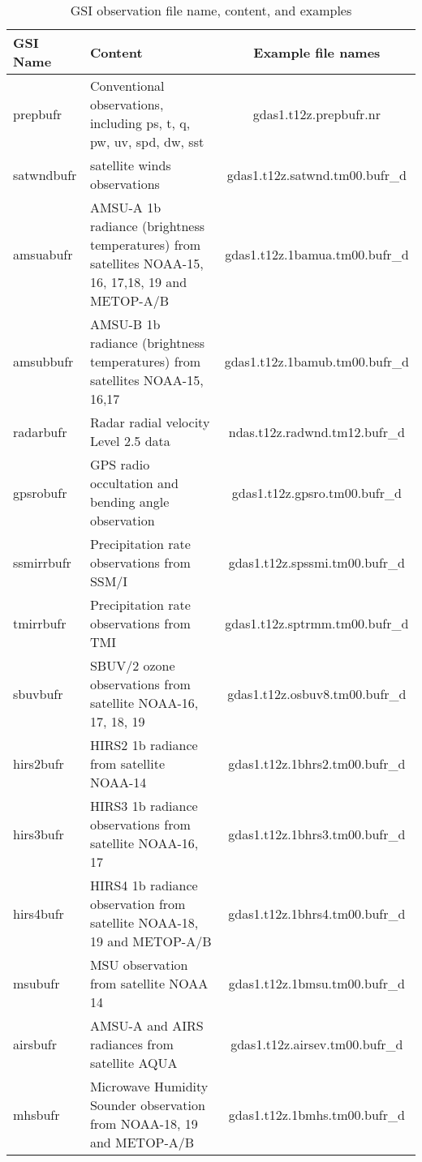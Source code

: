 \begin{table}[htbp]
\centering
\begin{footnotesize}
\caption{GSI observation file name, content, and examples}
\begin{tabular}{|l|p{7cm}|c|}
\hline
\hline
GSI Name  & Content & Example file names \\
\hline
\hline
prepbufr & Conventional observations, including ps, t, q, pw, uv, spd, dw, sst & gdas1.t12z.prepbufr.nr \\
\hline
satwndbufr & satellite winds observations &	gdas1.t12z.satwnd.tm00.bufr\_d \\
\hline
amsuabufr &	AMSU-A 1b radiance (brightness temperatures) from satellites
 NOAA-15, 16, 17,18, 19 and METOP-A/B &	gdas1.t12z.1bamua.tm00.bufr\_d \\
\hline
amsubbufr &	AMSU-B 1b radiance (brightness temperatures) from satellites NOAA-15, 16,17 &	gdas1.t12z.1bamub.tm00.bufr\_d \\
\hline
radarbufr &	Radar radial velocity Level 2.5 data &	ndas.t12z.radwnd.tm12.bufr\_d \\
\hline
gpsrobufr &	GPS radio occultation and bending angle observation & gdas1.t12z.gpsro.tm00.bufr\_d \\
\hline
ssmirrbufr & Precipitation rate observations from SSM/I & gdas1.t12z.spssmi.tm00.bufr\_d \\
\hline
tmirrbufr &	Precipitation rate observations from TMI & 	gdas1.t12z.sptrmm.tm00.bufr\_d \\
\hline
sbuvbufr &	SBUV/2 ozone observations from satellite NOAA-16, 17, 18, 19 &	gdas1.t12z.osbuv8.tm00.bufr\_d \\
\hline
hirs2bufr &	HIRS2 1b radiance from satellite NOAA-14 &	gdas1.t12z.1bhrs2.tm00.bufr\_d \\
\hline
hirs3bufr &	HIRS3 1b radiance observations from satellite NOAA-16, 17 &	gdas1.t12z.1bhrs3.tm00.bufr\_d \\
\hline
hirs4bufr &	HIRS4 1b radiance observation from satellite NOAA-18, 19 and METOP-A/B &	gdas1.t12z.1bhrs4.tm00.bufr\_d \\
\hline
msubufr	& MSU observation from satellite NOAA 14  &	gdas1.t12z.1bmsu.tm00.bufr\_d \\
\hline
airsbufr &	AMSU-A and AIRS radiances from satellite AQUA &	gdas1.t12z.airsev.tm00.bufr\_d \\
\hline
mhsbufr	& Microwave Humidity Sounder observation from NOAA-18, 19 and METOP-A/B &	gdas1.t12z.1bmhs.tm00.bufr\_d \\

\end{tabular}
\end{footnotesize}
\end{table}
